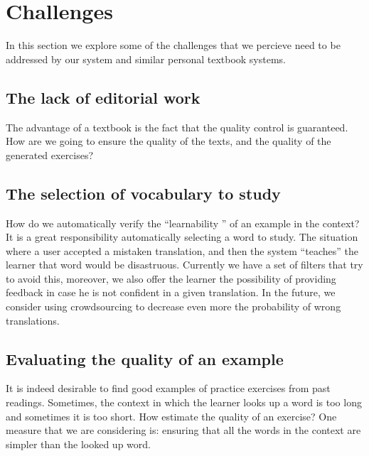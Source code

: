 

\newpage
\section{Challenges}

In this section we explore some of the challenges that we percieve need to be addressed by our system and similar personal textbook systems.

\subsection{The lack of editorial work}
The advantage of a textbook is the fact that the quality control is guaranteed. How are we going to ensure the quality of the texts, and the quality of the generated exercises? 

\subsection{The selection of vocabulary to study}
How do we automatically verify the ``learnability '' of an example in the context? It is a great responsibility automatically selecting a word to study. The situation where a user accepted a mistaken translation, and then the system ``teaches'' the learner that word would be disastruous. Currently we have a set of filters that try to avoid this, moreover, we also offer the learner the possibility of providing feedback in case he is not confident in a given translation. In the future, we consider using crowdsourcing to decrease even more the probability of wrong translations.



\subsection{Evaluating the quality of an example}

It is indeed desirable to find good examples of practice exercises from past readings. Sometimes, the context in which the learner looks up a word is too long and sometimes it is too short. How estimate the quality of an exercise? One measure that we are considering is: ensuring that all the words in the context are simpler than the looked up word. 


